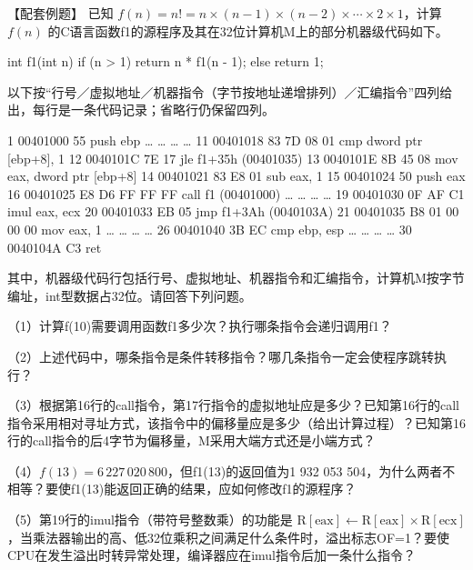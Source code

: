 \begin{example}[配套例题]

【配套例题】 已知 \(f(n)=n!=n\times(n-1)\times(n-2)\times\cdots\times2\times1\)，计算 \(f(n)\) 的C语言函数f1的源程序及其在32位计算机M上的部分机器级代码如下。

\begin{codeblock}[language=C]
int f1(int n) {
    if (n > 1)
        return n * f1(n - 1);
    else
        return 1;
}
\end{codeblock}

以下按``行号／虚拟地址／机器指令（字节按地址递增排列）／汇编指令''四列给出，每行是一条代码记录；省略行仍保留四列。

\begin{codeblock}[language={}]
 1  00401000  55              push ebp
 …  …         …               …
11  00401018  83 7D 08 01     cmp dword ptr [ebp+8], 1
12  0040101C  7E 17           jle f1+35h (00401035)
13  0040101E  8B 45 08        mov eax, dword ptr [ebp+8]
14  00401021  83 E8 01        sub eax, 1
15  00401024  50              push eax
16  00401025  E8 D6 FF FF FF  call f1 (00401000)
 …  …         …               …
19  00401030  0F AF C1        imul eax, ecx
20  00401033  EB 05           jmp f1+3Ah (0040103A)
21  00401035  B8 01 00 00 00  mov eax, 1
 …  …         …               …
26  00401040  3B EC           cmp ebp, esp
 …  …         …               …
30  0040104A  C3              ret
\end{codeblock}

其中，机器级代码行包括行号、虚拟地址、机器指令和汇编指令，计算机M按字节编址，int型数据占32位。请回答下列问题。

（1）计算f(10)需要调用函数f1多少次？执行哪条指令会递归调用f1？

（2）上述代码中，哪条指令是条件转移指令？哪几条指令一定会使程序跳转执行？

（3）根据第16行的call指令，第17行指令的虚拟地址应是多少？已知第16行的call指令采用相对寻址方式，该指令中的偏移量应是多少（给出计算过程）？已知第16行的call指令的后4字节为偏移量，M采用大端方式还是小端方式？

（4）\(f(13)=6\,227\,020\,800\)，但f1(13)的返回值为1 932 053 504，为什么两者不相等？要使f1(13)能返回正确的结果，应如何修改f1的源程序？

（5）第19行的imul指令（带符号整数乘）的功能是 \(\mathrm R[\mathrm{eax}]\leftarrow\mathrm R[\mathrm{eax}]\times\mathrm R[\mathrm{ecx}]\)，当乘法器输出的高、低32位乘积之间满足什么条件时，溢出标志OF=1？要使CPU在发生溢出时转异常处理，编译器应在imul指令后加一条什么指令？

\end{example}


